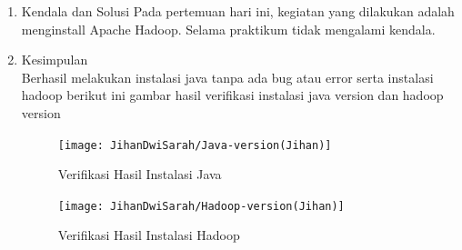 

\begin{enumerate}
\item Kendala dan Solusi
\newline Pada pertemuan hari ini, kegiatan yang dilakukan adalah menginstall Apache Hadoop. Selama praktikum tidak mengalami kendala.

\item Kesimpulan \\
Berhasil melakukan instalasi java tanpa ada bug atau error serta instalasi hadoop berikut ini gambar hasil verifikasi instalasi java version dan hadoop version 

\begin{figure}[!ht]
\texttt{[image: JihanDwiSarah/Java-version(Jihan)]}
\caption{Verifikasi Hasil Instalasi Java}
\label{gam:Java-version(Jihan)}
\end{figure} 

\begin{figure}[!ht]
\texttt{[image: JihanDwiSarah/Hadoop-version(Jihan)]}
\caption{Verifikasi Hasil Instalasi Hadoop}
\label{gam:Hadoop-version(Jihan)}
\end{figure}
\end{enumerate}


